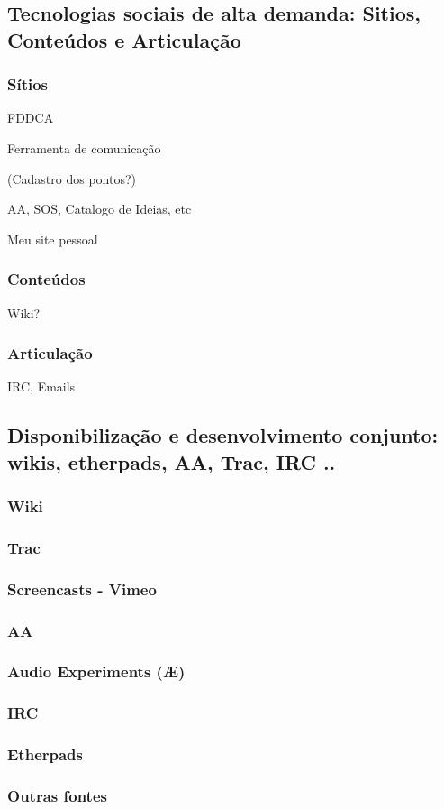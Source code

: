    \subsection{Tecnologias sociais de alta demanda: Sitios, Conteúdos e Articulação}

      \subsubsection{Sítios}

      FDDCA

      Ferramenta de comunicação

      (Cadastro dos pontos?)

      AA, SOS, Catalogo de Ideias, etc

      Meu site pessoal


      \subsubsection{Conteúdos}

      Wiki?

      \subsubsection{Articulação}

      IRC, Emails

\subsection{Disponibilização e desenvolvimento conjunto: wikis, etherpads, AA, Trac, IRC ..}

\subsubsection{Wiki}

\subsubsection{Trac}

\subsubsection{Screencasts - Vimeo}

\subsubsection{AA}

\subsubsection{Audio Experiments (Æ)}

\subsubsection{IRC}

\subsubsection{Etherpads}

\subsubsection{Outras fontes}


